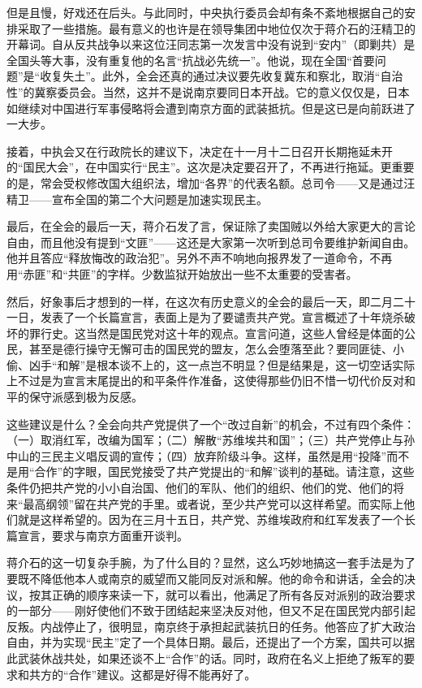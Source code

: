 \documentclass[10pt]{book}
\begin{document}
但是且慢，好戏还在后头。与此同时，中央执行委员会却有条不紊地根据自己的安排采取了一些措施。最有意义的也许是在领导集团中地位仅次于蒋介石的汪精卫的开幕词。自从反共战争以来这位汪同志第一次发言中没有说到“安内”（即剿共）是全国头等大事，没有重复他的名言“抗战必先统一”。他说，现在全国“首要问题”是“收复失土”。此外，全会还真的通过决议要先收复冀东和察北，取消“自治性”的冀察委员会。当然，这并不是说南京要同日本开战。它的意义仅仅是，日本如继续对中国进行军事侵略将会遭到南京方面的武装抵抗。但是这已是向前跃进了一大步。

接着，中执会又在行政院长的建议下，决定在十一月十二日召开长期拖延未开的“国民大会”，在中国实行“民主”。这次是决定要召开了，不再进行拖延。更重要的是，常会受权修改国大组织法，增加“各界”的代表名额。总司令——又是通过汪精卫——宣布全国的第二个大问题是加速实现民主。

最后，在全会的最后一天，蒋介石发了言，保证除了卖国贼以外给大家更大的言论自由，而且他没有提到“文匪”——这还是大家第一次听到总司令要维护新闻自由。他并且答应“释放悔改的政治犯”。另外不声不响地向报界发了一道命令，不再用“赤匪”和“共匪”的字样。少数监狱开始放出一些不太重要的受害者。

然后，好象事后才想到的一样，在这次有历史意义的全会的最后一天，即二月二十一日，发表了一个长篇宣言，表面上是为了要谴责共产党。宣言概述了十年烧杀破坏的罪行史。这当然是国民党对这十年的观点。宣言问道，这些人曾经是体面的公民，甚至是德行操守无懈可击的国民党的盟友，怎么会堕落至此？要同匪徒、小偷、凶手“和解”是根本谈不上的，这一点岂不明显？但是结果是，这一切空话实际上不过是为宣言末尾提出的和平条件作准备，这使得那些仍旧不惜一切代价反对和平的保守派感到极为反感。

这些建议是什么？全会向共产党提供了一个“改过自新”的机会，不过有四个条件：（一）取消红军，改编为国军；（二）解散“苏维埃共和国”；（三）共产党停止与孙中山的三民主义唱反调的宣传；（四）放弃阶级斗争。这样，虽然是用“投降”而不是用“合作”的字眼，国民党接受了共产党提出的“和解”谈判的基础。请注意，这些条件仍把共产党的小小自治国、他们的军队、他们的组织、他们的党、他们的将来“最高纲领”留在共产党的手里。或者说，至少共产党可以这样希望。而实际上他们就是这样希望的。因为在三月十五日，共产党、苏维埃政府和红军发表了一个长篇宣言，要求与南京方面重开谈判。

蒋介石的这一切复杂手腕，为了什么目的？显然，这么巧妙地搞这一套手法是为了要既不降低他本人或南京的威望而又能同反对派和解。他的命令和讲话，全会的决议，按其正确的顺序来读一下，就可以看出，他满足了所有各反对派别的政治要求的一部分——刚好使他们不致于团结起来坚决反对他，但又不足在国民党内部引起反叛。内战停止了，很明显，南京终于承担起武装抗日的任务。他答应了扩大政治自由，并为实现“民主”定了一个具体日期。最后，还提出了一个方案，国共可以据此武装休战共处，如果还谈不上“合作”的话。同时，政府在名义上拒绝了叛军的要求和共方的“合作”建议。这都是好得不能再好了。
\end{document}
